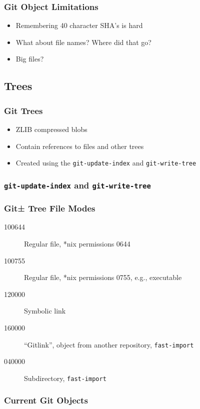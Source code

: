 \documentclass{beamer}
\begin{document}
\begin{frame}
\frametitle{Git Object Limitations}
\begin{itemize}
\item{Remembering 40 character SHA's is hard}
\item{What about file names? Where did that go?}
\item{Big files?}
\end{itemize}
\end{frame}

\subsection{Trees}

\begin{frame}
\frametitle{Git Trees}
\begin{itemize}
\item{ZLIB compressed blobs}
\item{Contain references to files and other trees}
\item{Created using the \texttt{git-update-index} and \texttt{git-write-tree}}
\end{itemize}
\end{frame}

\begin{frame}[fragile]
\frametitle{\texttt{git-update-index} and \texttt{git-write-tree}}

\end{frame}

\begin{frame}
\frametitle{Git± Tree File Modes}
\begin{description}
\item[100644]{Regular file, *nix permissions 0644}
\item[100755]{Regular file, *nix permissions 0755, e.g., executable}
\item[120000]{Symbolic link}
\item[160000]{``Gitlink'', object from another repository, \texttt{fast-import}}
\item[040000]{Subdirectory, \texttt{fast-import}}
\end{description}
\end{frame}

\begin{frame}[fragile]
\frametitle{Current Git Objects}

\end{frame}
\end{document}
